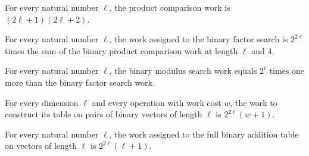 \begin{theorem}
\label{FABL.binaryProductComparisonWork_eq}
\leanok
{}
For every natural number $\ell$, the product comparison work is $(2\ell+1)(2\ell+2)$.
\end{theorem}

\begin{theorem}
\label{FABL.binaryFactorSearchWork_eq}
\leanok
{}
For every natural number $\ell$, the work assigned to the binary factor search is
$2^{2\ell}$ times the sum of the binary product comparison work at length $\ell$ and
$4$.
\end{theorem}

\begin{theorem}
\label{FABL.binaryModulusSearchWork_eq}
\leanok
{}
For every natural number $\ell$, the binary modulus search work equals $2^\ell$ times
one more than the binary factor search work.
\end{theorem}

\begin{theorem}
\label{FABL.binaryOperationTableWork_eq}
\leanok
{}
For every dimension $\ell$ and every operation with work cost $w$, the work to construct
its table on pairs of binary vectors of length $\ell$ is $2^{2\ell}(w+1)$.
\end{theorem}

\begin{theorem}
\label{FABL.binaryAdditionTableWork_eq}
\leanok
{}
For every natural number $\ell$, the work assigned to the full binary addition table on
vectors of length $\ell$ is $2^{2\ell}(\ell+1)$.
\end{theorem}

